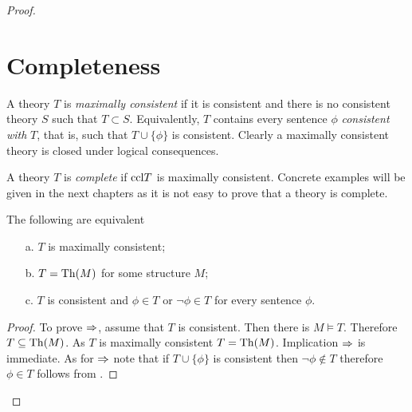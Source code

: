 \begin{proof}
\begin{proposition}

\end{proposition}

% 
% 
% 


\section{Completeness}

A theory $T$ is \emph{maximally consistent\/} if it is consistent and there is no consistent theory $S$ such that $T\subset S$.
Equivalently, $T$ contains every sentence $\phi$ \emph{consistent with\/} $T$, that is, such that $T\cup\{\phi\}$ is consistent.
Clearly a maximally consistent theory is closed under logical consequences.

A theory $T$ is \emph{complete\/} if ${\rm ccl} T$ is maximally consistent.
Concrete examples will be given in the next chapters as it is not easy to prove that a theory is complete.

\begin{proposition}\label{fattoconsistenzasen4sostretto}
The following are equivalent
\begin{itemize}
\item[a.] $T$ is maximally consistent;
\item[b.] $T={\rm Th}(M)$ for some structure $M$;
\item[c.] $T$ is consistent and $\phi\in T$ or $\neg\phi\in T$ for every sentence $\phi$.
\end{itemize}
\end{proposition}
\begin{proof}
To prove $\Rightarrow$, assume that $T$ is consistent.
Then there is $M\models T$.
Therefore $T\subseteq{\rm Th} (M)$.
As $T$ is maximally consistent $T={\rm Th}(M)$.
Implication $\Rightarrow$ is immediate.
 As for $\Rightarrow$ note that if $T\cup\{\phi\}$ is consistent then $\neg\phi\not\in T$ therefore $\phi\in T$ follows from .
\end{proof}


\end{proof}
